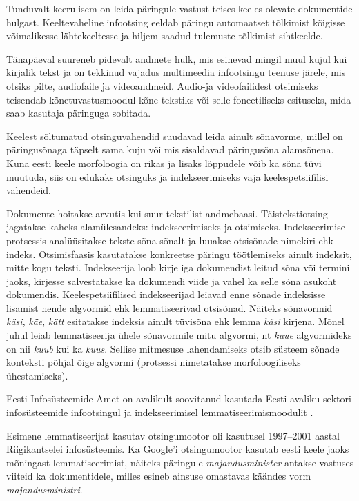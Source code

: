 \begin{multicols}{2}
Tunduvalt keerulisem on leida päringule vastust teises keeles olevate dokumentide hulgast. 
Keeltevaheline infootsing eeldab päringu automaatset tõlkimist kõigisse võimalikesse lähtekeeltesse ja hiljem saadud tulemuste tõlkimist sihtkeelde. 

Tänapäeval suureneb pidevalt andmete hulk, mis esinevad mingil muul kujul kui kirjalik tekst ja on tekkinud vajadus multimeedia infootsingu teenuse järele, mis otsiks pilte, audiofaile ja videoandmeid. 
Audio-ja videofailidest otsimiseks teisendab kõnetuvastusmoodul kõne tekstiks või selle foneetiliseks esituseks, mida saab kasutaja päringuga sobitada. 

Keelest sõltumatud otsinguvahendid suudavad leida ainult sõnavorme, millel on päringusõnaga täpselt sama kuju või mis sisaldavad päringusõna alamsõnena. 
Kuna eesti keele morfoloogia on rikas ja lisaks lõppudele võib ka sõna tüvi muutuda, siis on edukaks otsinguks ja indekseerimiseks vaja keelespetsiifilisi vahendeid. 

Dokumente hoitakse arvutis kui suur tekstilist andmebaasi. 
Täistekstiotsing jagatakse kaheks alamülesandeks: indekseerimiseks ja otsimiseks. 
Indekseerimise protsessis analüüsitakse tekste sõna-sõnalt ja luuakse otsisõnade nimekiri ehk indeks. 
Otsimisfaasis kasutatakse konkreetse päringu töötlemiseks ainult indeksit, mitte kogu teksti. 
Indekseerija loob kirje iga dokumendist leitud sõna või termini jaoks, kirjesse salvestatakse ka dokumendi viide ja vahel ka selle sõna asukoht dokumendis.
Keelespetsiifilised indekseerijad leiavad enne sõnade indeksisse lisamist nende algvormid ehk lemmatiseerivad otsisõnad. 
Näiteks sõnavormid \textit{käsi}, \textit{käe}, \textit{kätt} esitatakse indeksis ainult tüvisõna ehk lemma \textit{käsi} kirjena. 
Mõnel juhul leiab lemmatiseerija ühele sõnavormile mitu algvormi, nt \textit{kuue} algvormideks on nii \textit{kuub} kui ka \textit{kuus}. 
Sellise mitmesuse lahendamiseks otsib süsteem sõnade konteksti põhjal õige algvormi (protsessi nimetatakse morfoloogiliseks ühestamiseks). 


Eesti Infosüsteemide Amet on avalikult soovitanud kasutada Eesti avaliku sektori infosüsteemide infootsingul ja indeksee\-rimisel lemmatiseerimismoodulit \cite{RIA}.

Esimene lemmatiseerijat kasutav otsingumootor oli kasutusel 1997--2001 aastal Riigi\-kantselei infosüsteemis.
Ka Google’i otsingu\-mootor kasutab eesti keele jaoks mõningast lemmatiseerimist, näiteks päringule \textit{majandusminister} antakse vastuses viiteid ka dokumentidele, milles esineb ainsuse omastavas käändes vorm \textit{majandus\-ministri}.


\end{multicols}
